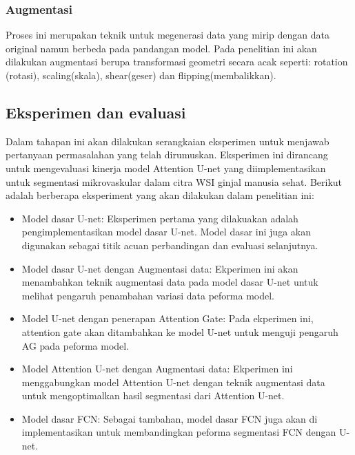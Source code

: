 \subsubsection{Augmentasi}

\noindent Proses ini merupakan teknik untuk megenerasi  data yang mirip dengan data original namun berbeda pada pandangan model. Pada penelitian ini akan dilakukan augmentasi berupa transformasi geometri secara acak seperti: rotation (rotasi), scaling(skala), shear(geser) dan flipping(membalikkan).


\subsection{Eksperimen dan evaluasi}

\noindent Dalam tahapan ini akan dilakukan serangkaian eksperimen untuk menjawab pertanyaan permasalahan yang telah dirumuskan. Eksperimen ini dirancang untuk mengevaluasi kinerja model Attention U-net yang diimplementasikan untuk segmentasi mikrovaskular dalam citra WSI ginjal manusia sehat. Berikut adalah berberapa eksperiment yang akan dilakukan dalam penelitian ini:

\begin{itemize}
	\item Model dasar U-net:
	\noindent Eksperimen pertama yang dilakuakan adalah pengimplementasikan model dasar U-net. Model dasar ini juga akan digunakan sebagai titik acuan perbandingan dan evaluasi selanjutnya.
	
	\item Model dasar U-net dengan Augmentasi data:
	\noindent Ekperimen ini akan menambahkan teknik augmentasi data pada model dasar U-net  untuk melihat pengaruh penambahan variasi data peforma model.

	\item Model U-net dengan penerapan Attention Gate:
	\noindent Pada ekperimen ini, attention gate akan ditambahkan ke model U-net untuk menguji pengaruh AG pada peforma model.
	
	\item Model Attention U-net dengan Augmentasi data:
	\noindent Ekperimen ini menggabungkan model Attention U-net dengan teknik augmentasi data untuk mengoptimalkan hasil segmentasi dari Attention U-net.
	
	\item Model dasar FCN:
	\noindent Sebagai tambahan, model dasar FCN juga akan di implementasikan untuk membandingkan peforma segmentasi FCN dengan U-net.
\end{itemize}

